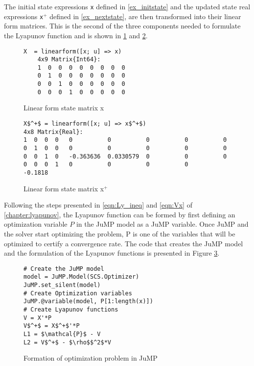 The initial state expressions \texttt{x} defined in \cref{ex_initstate} and the updated state real expressions \texttt{x$^+$} defined in \cref{ex_nextstate}, are then transformed into their linear form matrices. This is the second of the three components needed to formulate the Lyapunov function and is shown in \cref{ex_linearform_initstate} and \cref{ex_linearform_nextstate}.

\begin{figure}[h!]
    \begin{lstlisting}[mathescape]
X  = linearform([x; u] => x)
    4x9 Matrix{Int64}:
    1  0  0  0  0  0  0  0  0
    0  1  0  0  0  0  0  0  0
    0  0  1  0  0  0  0  0  0
    0  0  0  1  0  0  0  0  0    
    \end{lstlisting}
    \caption{Linear form state matrix x}
    \label{ex_linearform_initstate}
\end{figure}
\begin{figure}[h!]
    \begin{lstlisting}[mathescape]
X$^+$ = linearform([x; u] => x$^+$)
4x8 Matrix{Real}:
1  0  0  0   0          0          0          0          0
0  1  0  0   0          0          0          0          0
0  0  1  0   -0.363636  0.0330579  0          0          0
0  0  0  1   0          0          0          0         -0.1818
\end{lstlisting}
\caption{Linear form state matrix x$^+$}
\label{ex_linearform_nextstate}
\end{figure}
Following the steps presented in \eqref{eqn:Ly_ineq} and \eqref{eqn:Vx} of \cref{chapter:lyapunov}, the Lyapunov function can be formed by first defining an optimization variable $P$ in the JuMP model as a JuMP variable. Once JuMP and the solver start optimizing the problem, P is one of the variables that will be optimized to certify a convergence rate. The code that creates the JuMP model and the formulation of the Lyapunov functions is presented in Figure \ref*{ex_lycode}.

\begin{figure}[h!]
    \begin{lstlisting}[mathescape]
# Create the JuMP model
model = JuMP.Model(SCS.Optimizer) 
JuMP.set_silent(model)
# Create Optimization variables
JuMP.@variable(model, P[1:length(x)]) 
# Create Lyapunov functions
V = X'*P
V$^+$ = X$^+$'*P
L1 = $\mathcal{P}$ - V
L2 = V$^+$ - $\rho$$^2$*V
\end{lstlisting}
\caption{Formation of optimization problem in JuMP}
\label{ex_lycode}
\end{figure}

